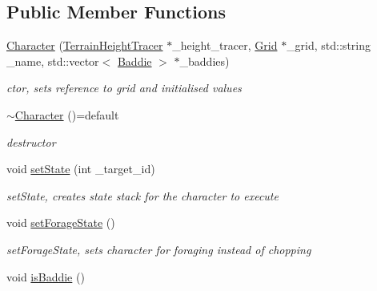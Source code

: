 \subsection*{Public Member Functions}
\begin{DoxyCompactItemize}
\item 
\hyperlink{class_character_a152dd2fb2764d5bf9e3a1142af1c3e88}{Character} (\hyperlink{class_terrain_height_tracer}{Terrain\+Height\+Tracer} $\ast$\+\_\+height\+\_\+tracer, \hyperlink{class_grid}{Grid} $\ast$\+\_\+grid, std\+::string \+\_\+name, std\+::vector$<$ \hyperlink{class_baddie}{Baddie} $>$ $\ast$\+\_\+baddies)
\begin{DoxyCompactList}\small\item\em ctor, sets reference to grid and initialised values \end{DoxyCompactList}\item 
\hypertarget{class_character_a400f79a5c5cdd8c2b33e50e5c744d1f7}{}\hyperlink{class_character_a400f79a5c5cdd8c2b33e50e5c744d1f7}{$\sim$\+Character} ()=default\label{class_character_a400f79a5c5cdd8c2b33e50e5c744d1f7}

\begin{DoxyCompactList}\small\item\em destructor \end{DoxyCompactList}\item 
\hypertarget{class_character_ade0b945af2de2bbd58b24325279697d3}{}void \hyperlink{class_character_ade0b945af2de2bbd58b24325279697d3}{set\+State} (int \+\_\+target\+\_\+id)\label{class_character_ade0b945af2de2bbd58b24325279697d3}

\begin{DoxyCompactList}\small\item\em set\+State, creates state stack for the character to execute \end{DoxyCompactList}\item 
\hypertarget{class_character_aefdc0a717c6d04a4d1bc8d7219441454}{}void \hyperlink{class_character_aefdc0a717c6d04a4d1bc8d7219441454}{set\+Forage\+State} ()\label{class_character_aefdc0a717c6d04a4d1bc8d7219441454}

\begin{DoxyCompactList}\small\item\em set\+Forage\+State, sets character for foraging instead of chopping \end{DoxyCompactList}\item 
\hypertarget{class_character_a9c322a1791ee15a9508c3abb0c414c11}{}void \hyperlink{class_character_a9c322a1791ee15a9508c3abb0c414c11}{is\+Baddie} ()\label{class_character_a9c322a1791ee15a9508c3abb0c414c11}


\end{DoxyCompactItemize}
